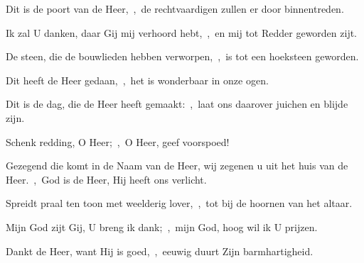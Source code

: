 \documentclass[12pt,twoside,a5paper]{article}
\begin{document}
\begin{halfparskip}
  Dit is de poort van de Heer,~\sep\ de rechtvaardigen zullen er door binnentreden.

  Ik zal U danken, daar Gij mij verhoord hebt,~\sep\ en mij tot Redder geworden zijt.

  De steen, die de bouwlieden hebben verworpen,~\sep\ is tot een hoeksteen geworden.

  Dit heeft de Heer gedaan,~\sep\ het is wonderbaar in onze ogen.

  Dit is de dag, die de Heer heeft gemaakt:~\sep\ laat ons daarover juichen en blijde zijn.

  Schenk redding, O Heer;~\sep\ O Heer, geef voorspoed!

  Gezegend die komt in de Naam van de Heer, wij zegenen u uit het huis van de Heer.~\sep\ God is de Heer, Hij heeft ons verlicht.

  Spreidt praal ten toon met weelderig lover,~\sep\ tot bij de hoornen van het altaar.

  Mijn God zijt Gij, U breng ik dank;~\sep\ mijn God, hoog wil ik U prijzen.

  Dankt de Heer, want Hij is goed,~\sep\ eeuwig duurt Zijn barmhartigheid.
\end{halfparskip}
\end{document}
